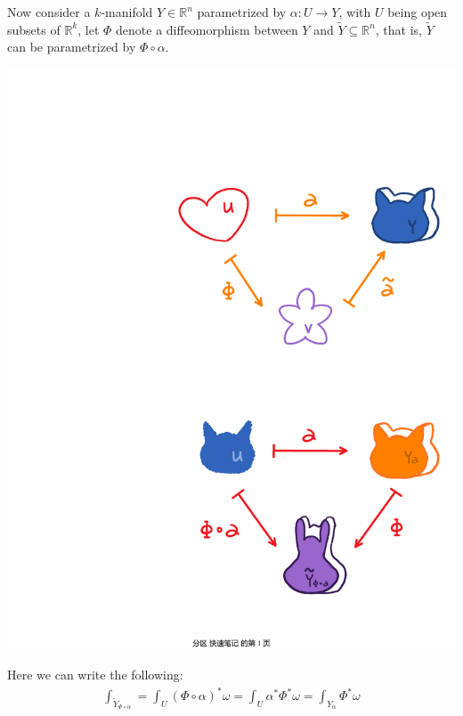 \documentclass[15pt]{book}
\theoremstyle{break}
\theoremstyle{break}
\newcommand{\R}{\mathbb{R}}
\newcommand{\that}[1]{\widetilde{#1}}
\begin{document}
Now consider a $k$-manifold $Y \in \R^n$ parametrized by $\alpha:U \to Y$, with $U$ being open subsets of $\R^k$, let $\Phi$ denote a diffeomorphism between $Y$ and $\that{Y} \subseteq \R^n$, that is, $\that{Y}$ can be parametrized by $\Phi \circ \alpha$. 
\begin{center}
\includegraphics[scale=0.5]{Intkform1.pdf}
\end{center}

Here we can write the following:
\begin{align*}
\int_{\that{Y}_{\Phi \circ \alpha}} = \int_U (\Phi\circ \alpha)^*\omega = \int_U \alpha^*\Phi^*\omega = \int_{Y_\alpha} \Phi^*\omega
\end{align*}


\newpage
\end{document}
